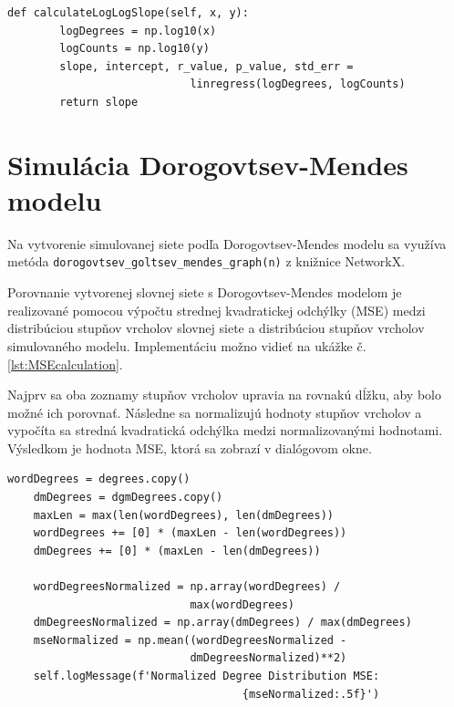 \pagebreak

\begin{lstlisting}[caption={Výpočet exponentu $\gamma$ mocninového rozdelenia \ref{eq:power_law_distribution_scale_free}. }, label={lst:powerLawExponentMethod}]
    def calculateLogLogSlope(self, x, y):
        logDegrees = np.log10(x)
        logCounts = np.log10(y)
        slope, intercept, r_value, p_value, std_err = 
                            linregress(logDegrees, logCounts)
        return slope
\end{lstlisting}

\section{Simulácia Dorogovtsev-Mendes modelu}\label{sec:simulationDorogovtsevMendes}

Na vytvorenie simulovanej siete podľa Dorogovtsev-Mendes modelu sa využíva metóda \newline \texttt{dorogovtsev\_goltsev\_mendes\_graph(n)} z knižnice NetworkX.

Porovnanie vytvorenej slovnej siete s Dorogovtsev-Mendes modelom je realizované pomocou výpočtu strednej kvadratickej odchýlky (MSE) medzi
distribúciou stupňov vrcholov slovnej siete a distribúciou stupňov vrcholov simulovaného modelu. Implementáciu možno vidieť na ukážke č. \ref{lst:MSEcalculation}.

\pagebreak

Najprv sa oba zoznamy stupňov vrcholov upravia na rovnakú dĺžku, aby bolo možné ich porovnať. Následne sa normalizujú hodnoty stupňov vrcholov
a vypočíta sa stredná kvadratická odchýlka medzi normalizovanými hodnotami. Výsledkom je hodnota MSE, ktorá sa zobrazí v dialógovom okne.

\begin{lstlisting}[caption={Výpočet strednej kvadratickej odchýlky analyzovanej siete a simulovaného modelu.}, label={lst:MSEcalculation}]
    wordDegrees = degrees.copy()
    dmDegrees = dgmDegrees.copy()
    maxLen = max(len(wordDegrees), len(dmDegrees))
    wordDegrees += [0] * (maxLen - len(wordDegrees))
    dmDegrees += [0] * (maxLen - len(dmDegrees))

    wordDegreesNormalized = np.array(wordDegrees) / 
                            max(wordDegrees)
    dmDegreesNormalized = np.array(dmDegrees) / max(dmDegrees)
    mseNormalized = np.mean((wordDegreesNormalized - 
                            dmDegreesNormalized)**2)
    self.logMessage(f'Normalized Degree Distribution MSE: 
                                    {mseNormalized:.5f}')
\end{lstlisting}


